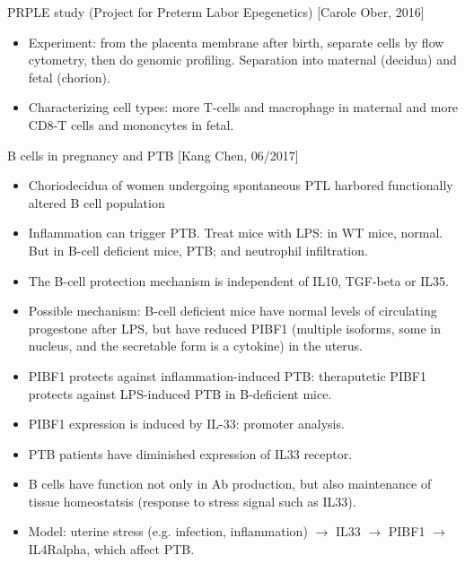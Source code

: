 \documentclass{report}
\begin{document}
PRPLE study (Project for Preterm Labor Epegenetics) [Carole Ober, 2016]
\begin{itemize}
	\item Experiment: from the placenta membrane after birth, separate cells by flow cytometry, then do genomic profiling. Separation into maternal (decidua) and fetal (chorion). 
	
	\item Characterizing cell types: more T-cells and macrophage in maternal and more CD8-T cells and mononcytes in fetal. 
\end{itemize}

B cells in pregnancy and PTB [Kang Chen, 06/2017]
\begin{itemize}
	
	\item Choriodecidua of women undergoing spontaneous PTL harbored functionally altered B cell population
	
	\item Inflammation can trigger PTB. Treat mice with LPS: in WT mice, normal. But in B-cell deficient mice, PTB; and neutrophil infiltration.
	
	\item The B-cell protection mechanism is independent of IL10, TGF-beta or IL35.
	
	\item Possible mechanism: B-cell deficient mice have normal levels of circulating progestone after LPS, but have reduced PIBF1 (multiple isoforms, some in nucleus, and the secretable form is a cytokine) in the uterus.
	
	\item PIBF1 protects against inflammation-induced PTB: theraputetic PIBF1 protects against LPS-induced PTB in B-deficient mice.
	
	\item PIBF1 expression is induced by IL-33: promoter analysis.
	
	\item PTB patients have diminished expression of IL33 receptor.
	
	\item B cells have function not only in Ab production, but also maintenance of tissue homeostatsis (response to stress signal such as IL33).
	
	\item Model: uterine stress (e.g. infection, inflammation) $\rightarrow$ IL33 $\rightarrow$ PIBF1 $\rightarrow$ IL4Ralpha, which affect PTB.
\end{itemize}
\end{document}
